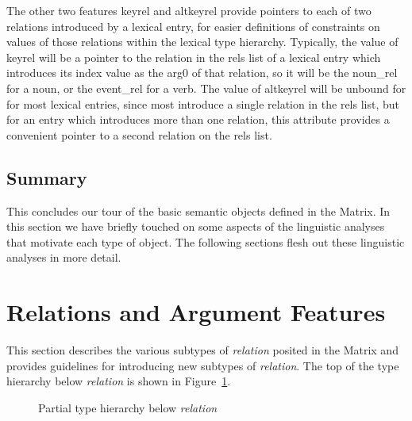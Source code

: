 \documentclass[12pt]{article}
\begin{document}
The other two features {\sc {-}{-}keyrel} and {\sc {-}{-}altkeyrel} provide
pointers to each of two relations introduced by a lexical entry, for easier
definitions of constraints on values of those relations within the lexical
type hierarchy.  Typically, the value of {\sc {-}{-}keyrel} will be a pointer
to the relation in the {\sc rels} list of a lexical entry which introduces
its {\sc index} value as the {\sc arg0} of that relation, so it will be
the noun\_rel for a noun, or the event\_rel for a verb.  The value of
{\sc {-}{-}altkeyrel} will be unbound for for most lexical entries, since
most introduce a single relation in the {\sc rels} list, but for
an entry which introduces more than one relation, this attribute provides
a convenient pointer to a second relation on the {\sc rels} list.


\subsection{Summary}

This concludes our tour of the basic semantic objects defined in the
Matrix.   In this section we have briefly touched on some aspects
of the linguistic analyses that motivate each type of object.  The
following sections flesh out these linguistic analyses in more detail.

\section{Relations and Argument Features}
\label{relarg}

This section describes the various subtypes of {\it relation} posited
in the Matrix and provides guidelines for introducing new subtypes of
{\it relation}.  The top of the type hierarchy below {\it relation}
is shown in Figure~\ref{relhier}.

\begin{figure}[ht]
\begin{center}
{\it
\begin{tree}
\end{tree}
}
\end{center}
\caption{Partial type hierarchy below {\it relation}}
\label{relhier}
\end{figure}
\end{document}
